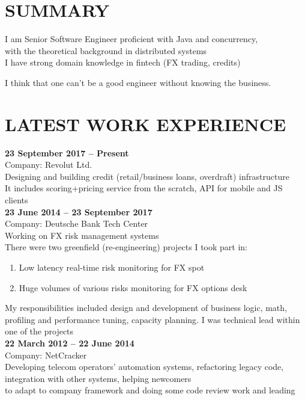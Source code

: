 \documentclass[margin,12pt]{res}
\begin{document}
  \address{
    kremsnx@gmail.com\\
    +7 (985) 9-64-8-512}

\begin{resume}
\section{SUMMARY}
I am Senior Software Engineer proficient with Java and concurrency, \\
with the theoretical background in distributed systems\\
I have strong domain knowledge in fintech (FX trading, credits)

I think that one can't be a good engineer without knowing the business.

\section{LATEST WORK EXPERIENCE}
\textbf{23 September 2017 -- Present}\\
Company: Revolut Ltd.\\
Designing and building credit (retail/business loans, overdraft) infrastructure\\
It includes scoring+pricing service from the scratch, API for mobile and JS\\ clients\\
\newline
\textbf{23 June 2014 -- 23 September 2017}\\
Company: Deutsche Bank Tech Center\\
Working on FX risk management systems\\
There were two greenfield (re-engineering) projects I took part in:
\begin{enumerate}
    \item Low latency real-time risk monitoring for FX spot 
    \item Huge volumes of various risks monitoring for FX options desk
\end{enumerate}
\vspace{-14pt}
My responsibilities included design and development of business logic, math,\\ 
profiling and performance tuning, capacity planning. I was technical lead within\\
 one of the projects\\
\newline
\textbf{22 March 2012 -- 22 June 2014}\\
Company: NetCracker\\
Developing telecom operators' automation systems, refactoring legacy code, \\
integration with other systems, helping newcomers\\
to adapt to company framework and doing some code review work and leading


\end{resume}
\end{document}

